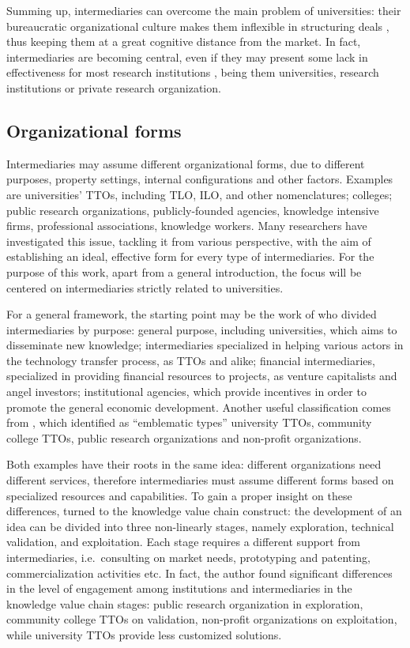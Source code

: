 Summing up, intermediaries can overcome the main problem of universities: their bureaucratic organizational culture makes them inflexible in structuring deals \citep{Siegel2003a}, thus keeping them at a great cognitive distance from the market. In fact, intermediaries are becoming central, even if they may present some lack in effectiveness for most research institutions \citep{Geuna2009}, being them universities, research institutions or private research organization.

\subsection{Organizational forms}

Intermediaries may assume different organizational forms, due to different purposes, property settings, internal configurations and other factors. Examples are universities' TTOs, including TLO, ILO, and other nomenclatures; colleges; public research organizations, publicly-founded agencies, knowledge intensive firms, professional associations, knowledge workers. Many researchers have investigated this issue, tackling it from various perspective, with the aim of establishing an ideal, effective form for every type of intermediaries. For the purpose of this work, apart from a general introduction, the focus will be centered on intermediaries strictly related to universities.

For a general framework, the starting point may be the work of \citet{Yusuf2008} who divided intermediaries by purpose: general purpose, including universities, which aims to disseminate new knowledge; intermediaries specialized in helping various actors in the technology transfer process, as TTOs and alike; financial intermediaries, specialized in providing financial resources to projects, as venture capitalists and angel investors; institutional agencies, which provide incentives in order to promote the general economic development. Another useful classification comes from \citet{Landry2013}, which identified as \enquote{emblematic types} university TTOs, community college TTOs, public research organizations and non-profit organizations.

Both examples have their roots in the same idea: different organizations need different services, therefore intermediaries must assume different forms based on specialized resources and capabilities. To gain a proper insight on these differences, \citet{Landry2013} turned to the knowledge value chain construct: the development of an idea can be divided into three non-linearly stages, namely exploration, technical validation, and exploitation. Each stage requires a different support from intermediaries, i.e.\ consulting on market needs, prototyping and patenting, commercialization activities etc. In fact, the author found significant differences in the level of engagement among institutions and intermediaries in the knowledge value chain stages: public research organization in exploration, community college TTOs on validation, non-profit organizations on exploitation, while university TTOs provide less customized solutions.

